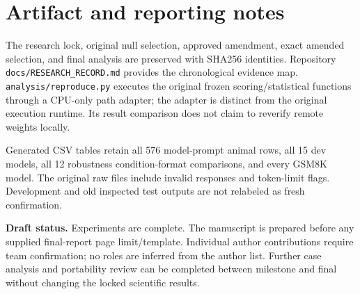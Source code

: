 \documentclass[11pt]{article}
\begin{document}
\section{Artifact and reporting notes}
The research lock, original null selection, approved amendment, exact amended selection, and final analysis are preserved with SHA256 identities. Repository \texttt{docs/RESEARCH\_RECORD.md} provides the chronological evidence map. \texttt{analysis/reproduce.py} executes the original frozen scoring/statistical functions through a CPU-only path adapter; the adapter is distinct from the original execution runtime. Its result comparison does not claim to reverify remote weights locally.

Generated CSV tables retain all 576 model-prompt animal rows, all 15 dev models, all 12 robustness condition-format comparisons, and every GSM8K model. The original raw files include invalid responses and token-limit flags. Development and old inspected test outputs are not relabeled as fresh confirmation.

\textbf{Draft status.} Experiments are complete. The manuscript is prepared before any supplied final-report page limit/template. Individual author contributions require team confirmation; no roles are inferred from the author list. Further case analysis and portability review can be completed between milestone and final without changing the locked scientific results.
\end{document}
